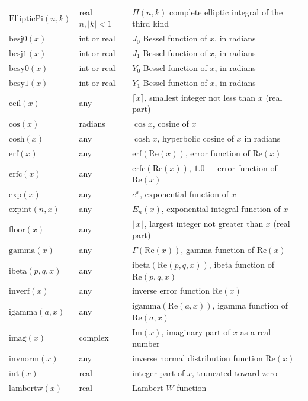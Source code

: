 \documentclass[
  hyper, lang=cn, 
  class=l3dox, 
]{../../zlatex/code/ztex}
\begin{document}
\begin{center}
\begin{longtable}{lll}
    \(\text{EllipticPi}(n,k)\) & real $n,|k|<1$ & $\Pi(n,k)$ complete elliptic integral of the third kind \\
    \(\text{besj0}(x)\) & int or real & $J_0$ Bessel function of $x$, in radians \\
    \(\text{besj1}(x)\) & int or real & $J_1$ Bessel function of $x$, in radians \\
    \(\text{besy0}(x)\) & int or real & $Y_0$ Bessel function of $x$, in radians \\
    \(\text{besy1}(x)\) & int or real & $Y_1$ Bessel function of $x$, in radians \\
    \(\text{ceil}(x)\) & any & $\lceil x \rceil$, smallest integer not less than $x$ (real part) \\
    \(\text{cos}(x)\) & radians & $\cos x$, cosine of $x$ \\
    \(\text{cosh}(x)\) & any & $\cosh x$, hyperbolic cosine of $x$ in radians \\
    \(\text{erf}(x)\) & any & $\text{erf}(\text{Re}(x))$, error function of $\text{Re}(x)$ \\
    \(\text{erfc}(x)\) & any & $\text{erfc}(\text{Re}(x))$, $1.0 - $ error function of $\text{Re}(x)$ \\
    \(\text{exp}(x)\) & any & $e^x$, exponential function of $x$ \\
    \(\text{expint}(n,x)\) & any & $E_n(x)$, exponential integral function of $x$ \\
    \(\text{floor}(x)\) & any & $\lfloor x \rfloor$, largest integer not greater than $x$ (real part) \\
    \(\text{gamma}(x)\) & any & $\Gamma(\text{Re}(x))$, gamma function of $\text{Re}(x)$ \\
    \(\text{ibeta}(p,q,x)\) & any & $\text{ibeta}(\text{Re}(p,q,x))$, ibeta function of $\text{Re}(p,q,x)$ \\
    \(\text{inverf}(x)\) & any & inverse error function $\text{Re}(x)$ \\
    \(\text{igamma}(a,x)\) & any & $\text{igamma}(\text{Re}(a,x))$, igamma function of $\text{Re}(a,x)$ \\
    \(\text{imag}(x)\) & complex & $\text{Im}(x)$, imaginary part of $x$ as a real number \\
    \(\text{invnorm}(x)\) & any & inverse normal distribution function $\text{Re}(x)$ \\
    \(\text{int}(x)\) & real & integer part of $x$, truncated toward zero \\
    \(\text{lambertw}(x)\) & real & Lambert $W$ function \\

\end{longtable}
\end{center}
\end{document}
